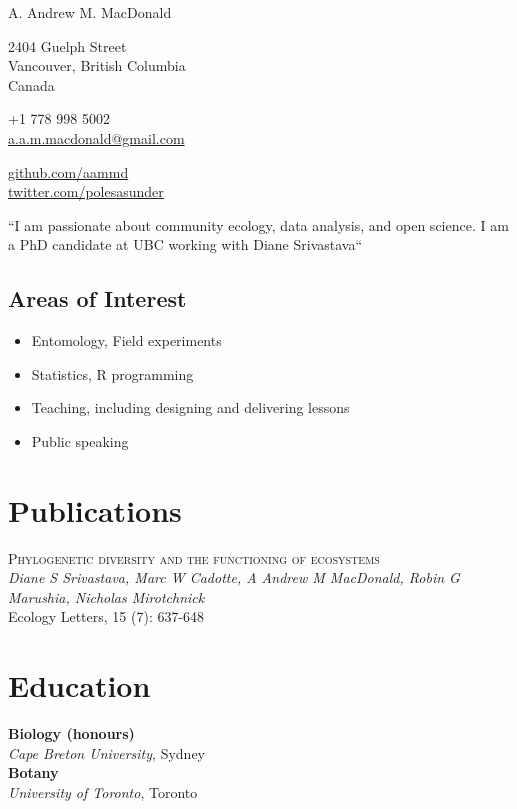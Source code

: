 \documentclass[10pt, a4paper]{article}
\newcommand{\note}[1]{\marginnote{\scriptsize #1}}
\begin{document}
{\LARGE A. Andrew M. MacDonald}\\[.2cm]

\begin{multicols}{2}

2404 Guelph Street\\
Vancouver, British Columbia\\
Canada\\

\vspace{-10pt}

+1 778 998 5002\\
\href{mailto:a.a.m.macdonald@gmail.com}{a.a.m.macdonald@gmail.com}\\


\columnbreak

\href{http://github.com/aammd}{github.com/aammd}\\
\href{http://twitter.com/polesasunder}{twitter.com/polesasunder}\\
\end{multicols}

\vspace{30pt}

``I am passionate about community ecology, data analysis, and open
science. I am a PhD candidate at UBC working with Diane Srivastava``

\subsection*{Areas of Interest}
\begin{itemize}
          \item Entomology, Field experiments
          \item Statistics, R programming
          \item Teaching, including designing and delivering lessons
          \item Public speaking
    \end{itemize}


\vspace{25pt}

\section*{Publications}
\noindent
\note{2012}\textsc{Phylogenetic diversity and the functioning of ecosystems}\\
\emph{Diane S Srivastava, Marc W Cadotte, A Andrew M MacDonald, Robin G
Marushia, Nicholas Mirotchnick}\\
Ecology Letters, 15 (7): 637-648\\[.2cm]

\section*{Education}
\noindent
\note{2006}\textbf{Biology (honours)}\\
\emph{Cape Breton University}, Sydney\\[.2cm]
\note{2009}\textbf{Botany}\\
\emph{University of Toronto}, Toronto\\[.2cm]
\end{document}
